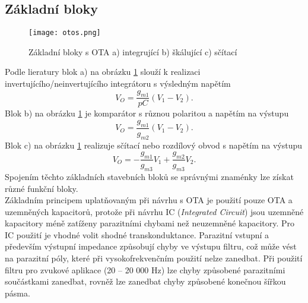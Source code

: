 \subsection{Základní bloky}
\begin{figure}[h]
\centering
\texttt{[image: otos.png]}
\caption[Základní bloky s OTA]{Základní bloky s OTA a) integrující b) škálující c) sčítací \cite{16} \label{s:BLO}}
\end{figure}
\noindent Podle lieratury \cite{16} blok a) na obrázku \ref{s:BLO} slouží k realizaci invertujícího/neinvertujícího integrátoru s výsledným napětím
\begin{equation}
V_O = \frac{g_{m1}}{pC}(V_1 - V_2).
\end{equation}
Blok b) na obrázku \ref{s:BLO} je komparátor s různou polaritou a napětím na výstupu
\begin{equation}
V_O = \frac{g_{m1}}{g_{m2}}(V_1 - V_2).
\end{equation}
Blok c) na obrázku \ref{s:BLO} realizuje sčítací nebo rozdílový obvod s napětím na výstupu
\begin{equation}
V_O = -\frac{g_{m1}}{g_{m3}}V_1 + \frac{g_{m2}}{g_{m3}}V_2.\label{s:BLO3}
\end{equation}
\noindent Spojením těchto základních stavebních bloků se správnými znaménky lze získat různé funkční bloky.\\
Základním principem uplatňovaným při návrhu s OTA je použití pouze OTA a uzemněných kapacitorů, protože při návrhu IC (\textit{Integrated Circuit}) jsou uzemněné kapacitory méně zatíženy parazitními chybami než neuzemněné kapacitory. Pro IC použití je vhodné volit shodné transkonduktance. Parazitní vstupní a především výstupní impedance způsobují chyby ve výstupu filtru, což může vést na parazitní póly, které při vysokofrekvenčním použití nelze zanedbat. Při použití filtru pro zvukové aplikace (20 -- 20 000 Hz) lze chyby způsobené parazitními součástkami zanedbat, rovněž lze zanedbat chyby způsobené konečnou šířkou pásma.
